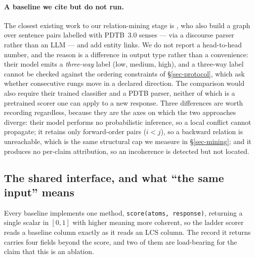 \paragraph{A baseline we cite but do not run.} The closest existing work to our relation-mining stage
is \citet{liustrube}, who also build a graph over sentence pairs labelled with PDTB~3.0 senses --- via
a discourse parser rather than an LLM --- and add entity links. We do not report a head-to-head number,
and the reason is a difference in output type rather than a convenience: their model emits a
\emph{three-way} label (low, medium, high), and a three-way label cannot be checked against the
ordering constraints of \S\ref{sec-protocol}, which ask whether consecutive rungs move in a declared
direction. The comparison would also require their trained classifier and a PDTB parser, neither of
which is a pretrained scorer one can apply to a new response. Three differences are worth recording
regardless, because they are the axes on which the two approaches diverge: their model performs no
probabilistic inference, so a local conflict cannot propagate; it retains only forward-order pairs
($i<j$), so a backward relation is unreachable, which is the same structural cap we measure in
\S\ref{sec-mining}; and it produces no per-claim attribution, so an incoherence is detected but not
located.


\subsection{The shared interface, and what ``the same input'' means}
\label{app-baseline-interface}

Every baseline implements one method, \texttt{score(atoms, response)}, returning a single scalar in
$[0,1]$ with higher meaning more coherent, so the ladder scorer reads a baseline column exactly as it
reads an LCS column. The record it returns carries four fields beyond the score, and two of them are
load-bearing for the claim that this is an ablation.

